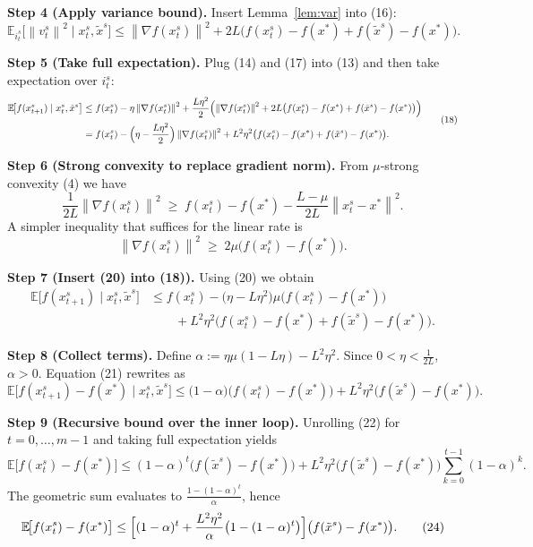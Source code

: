\documentclass{article}
\newcommand{\E}{\mathbb{E}}
\newcommand{\norm}[1]{\left\|#1\right\|}
\newcommand{\grad}{\nabla}
\begin{document}
\medskip
\noindent\textbf{Step 4 (Apply variance bound).}  
Insert Lemma~\ref{lem:var} into (16):
\[
\E_{i_{t}^{s}}\!\bigl[\norm{v_{t}^{s}}^{2}\mid x_{t}^{s},\tilde{x}^{s}\bigr]
\le \norm{\grad f(x_{t}^{s})}^{2}
+2L\bigl(f(x_{t}^{s})-f(x^{*})+f(\tilde{x}^{s})-f(x^{*})\bigr).
\tag{17}
\]

\medskip
\noindent\textbf{Step 5 (Take full expectation).}  
Plug (14) and (17) into (13) and then take expectation over $i_{t}^{s}$:
\[
\begin{aligned}
\E\!\bigl[f(x_{t+1}^{s})\mid x_{t}^{s},\tilde{x}^{s}\bigr]
&\le f(x_{t}^{s})-\eta\norm{\grad f(x_{t}^{s})}^{2}
+\frac{L\eta^{2}}{2}\Bigl(\norm{\grad f(x_{t}^{s})}^{2}
+2L\bigl(f(x_{t}^{s})-f(x^{*})+f(\tilde{x}^{s})-f(x^{*})\bigr)\Bigr)\\[0.2em]
&= f(x_{t}^{s})-\Bigl(\eta-\frac{L\eta^{2}}{2}\Bigr)\norm{\grad f(x_{t}^{s})}^{2}
+L^{2}\eta^{2}\bigl(f(x_{t}^{s})-f(x^{*})+f(\tilde{x}^{s})-f(x^{*})\bigr).
\end{aligned}
\tag{18}
\]

\medskip
\noindent\textbf{Step 6 (Strong convexity to replace gradient norm).}  
From $\mu$‑strong convexity (4) we have
\[
\frac{1}{2L}\norm{\grad f(x_{t}^{s})}^{2}\;\ge\; f(x_{t}^{s})-f(x^{*})-\frac{L-\mu}{2L}\norm{x_{t}^{s}-x^{*}}^{2}.
\tag{19}
\]
A simpler inequality that suffices for the linear rate is
\[
\norm{\grad f(x_{t}^{s})}^{2}\;\ge\;2\mu\bigl(f(x_{t}^{s})-f(x^{*})\bigr).
\tag{20}
\]

\medskip
\noindent\textbf{Step 7 (Insert (20) into (18)).}  
Using (20) we obtain
\[
\begin{aligned}
\E\!\bigl[f(x_{t+1}^{s})\mid x_{t}^{s},\tilde{x}^{s}\bigr]
&\le f(x_{t}^{s})-\bigl(\eta- L\eta^{2}\bigr)\mu\bigl(f(x_{t}^{s})-f(x^{*})\bigr)\\
&\qquad+L^{2}\eta^{2}\bigl(f(x_{t}^{s})-f(x^{*})+f(\tilde{x}^{s})-f(x^{*})\bigr) .
\end{aligned}
\tag{21}
\]

\medskip
\noindent\textbf{Step 8 (Collect terms).}  
Define $\alpha:=\eta\mu(1- L\eta)-L^{2}\eta^{2}$. Since $0<\eta<\frac{1}{2L}$, $\alpha>0$.
Equation (21) rewrites as
\[
\E\!\bigl[f(x_{t+1}^{s})-f(x^{*})\mid x_{t}^{s},\tilde{x}^{s}\bigr]
\le\bigl(1-\alpha\bigr)\bigl(f(x_{t}^{s})-f(x^{*})\bigr)
+L^{2}\eta^{2}\bigl(f(\tilde{x}^{s})-f(x^{*})\bigr).
\tag{22}
\]

\medskip
\noindent\textbf{Step 9 (Recursive bound over the inner loop).}  
Unrolling (22) for $t=0,\dots,m-1$ and taking full expectation yields
\[
\E\!\bigl[f(x_{t}^{s})-f(x^{*})\bigr]
\le (1-\alpha)^{t}\bigl(f(\tilde{x}^{s})-f(x^{*})\bigr)
+L^{2}\eta^{2}\bigl(f(\tilde{x}^{s})-f(x^{*})\bigr)\sum_{k=0}^{t-1}(1-\alpha)^{k}.
\tag{23}
\]
The geometric sum evaluates to $\frac{1-(1-\alpha)^{t}}{\alpha}$, hence
\[
\E\!\bigl[f(x_{t}^{s})-f(x^{*})\bigr]
\le\Bigl[(1-\alpha)^{t}+ \frac{L^{2}\eta^{2}}{\alpha}\bigl(1-(1-\alpha)^{t}\bigr)\Bigr]
\bigl(f(\tilde{x}^{s})-f(x^{*})\bigr).
\tag{24}
\]
\end{document}
